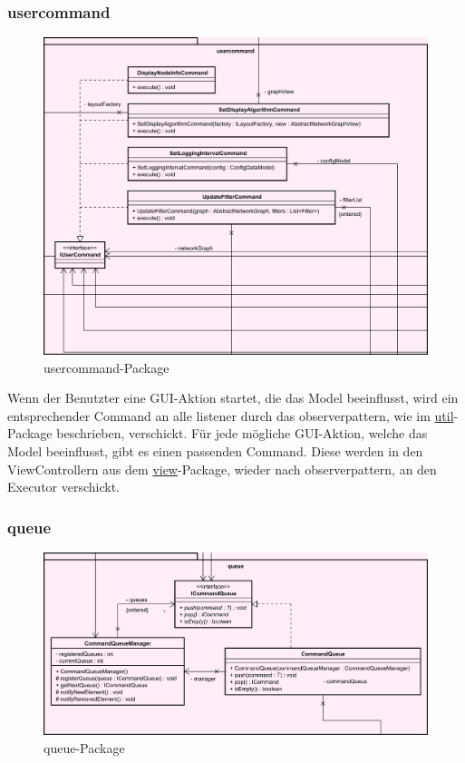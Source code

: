       \subsubsection{usercommand}
      \label{subsubsec:usercommand}

      \begin{figure}[H]
        \centering
        \includegraphics[width=\textwidth]{../diagramimages/usercommand.png}
        \caption{usercommand-Package}
      \end{figure}

      \medskip
      Wenn der Benutzter eine GUI-Aktion startet, die das Model beeinflusst,
      wird ein entsprechender Command an alle \gls{listener} durch das \gls{observerpattern}, wie im
      \hyperref[subsec:util]{util}-Package beschrieben, verschickt. Für jede mögliche
      GUI-Aktion, welche das Model beeinflusst, gibt es einen passenden Command.
      Diese werden in den ViewControllern aus dem \hyperref[subsec:view]{view}-Package, wieder nach \gls{observerpattern},
      an den Executor verschickt.

      \subsubsection{queue}
      \label{subsubsec:queue}

      \begin{figure}[H]
        \centering
        \includegraphics[width=\textwidth]{../diagramimages/queue.png}
        \caption{queue-Package}
      \end{figure}

